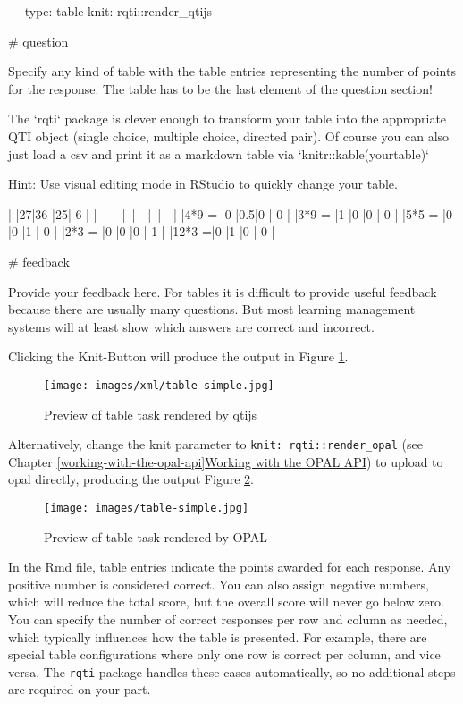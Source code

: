 \documentclass[twoside]{tufte-book}
\newenvironment{Shaded}{}{}
\begin{document}
\begin{Shaded}
\begin{Highlighting}
---
type: table
knit: rqti::render_qtijs
---

# question

Specify any kind of table with the table entries representing the number of
points for the response. The table has to be the last element of the question
section!

The `rqti` package is clever enough to transform your table into the appropriate
QTI object (single choice, multiple choice, directed pair). Of course you can
also just load a csv and print it as a markdown table via
`knitr::kable(yourtable)`

Hint: Use visual editing mode in RStudio to quickly change your table.

|      |27|36 |25| 6 |
|------|--|---|--|---|
|4*9 = |0 |0.5|0 | 0 |
|3*9 = |1 |0  |0 | 0 |
|5*5 = |0 |0  |1 | 0 |
|2*3 = |0 |0  |0 | 1 |
|12*3 =|0 |1  |0 | 0 |

# feedback

Provide your feedback here. For tables it is difficult to provide useful
feedback because there are usually many questions. But most learning management
systems will at least show which answers are correct and incorrect.
\end{Highlighting}
\end{Shaded}

Clicking the Knit-Button will produce the output in Figure \ref{tbl1qtijs}.

\begin{figure}
\centering
\texttt{[image: images/xml/table-simple.jpg]}
\caption{\label{tbl1qtijs}Preview of table task rendered by qtijs}
\end{figure}

\noindent \noindent Alternatively, change the knit parameter to \texttt{knit:\ rqti::render\_opal} (see Chapter \ref{working-with-the-opal-api}\href{api_opal.html}{Working with the OPAL API}) to upload to opal directly, producing the output Figure \ref{tbl1opal}.

\begin{figure}
\centering
\texttt{[image: images/table-simple.jpg]}
\caption{\label{tbl1opal}Preview of table task rendered by OPAL}
\end{figure}

In the Rmd file, table entries indicate the points awarded for each response. Any positive number is considered correct. You can also assign negative numbers, which will reduce the total score, but the overall score will never go below zero. You can specify the number of correct responses per row and column as needed, which typically influences how the table is presented. For example, there are special table configurations where only one row is correct per column, and vice versa. The \texttt{rqti} package handles these cases automatically, so no additional steps are required on your part.
\end{document}
